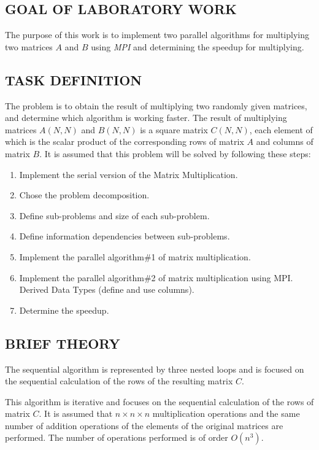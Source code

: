 \newpage
\subsection{GOAL OF LABORATORY WORK}\label{subsec:goal}

The purpose of this work is to implement two parallel algorithms for multiplying two matrices $A$ and $B$ using \textit{MPI} and determining the speedup for multiplying.

\subsection{TASK DEFINITION}\label{subsec:task_definition}

The problem is to obtain the result of multiplying two randomly given matrices, and determine which algorithm is working faster.
The result of multiplying matrices $A(N, N)$ and $B(N, N)$ is a square matrix $C(N, N)$, each element of which is the scalar product of the corresponding rows of matrix $A$ and columns of matrix $B$.
It is assumed that this problem will be solved by following these steps:
\begin{enumerate}
    \item Implement the serial version of the Matrix Multiplication.
    \item Chose the problem decomposition.
    \item Define sub-problems and size of each sub-problem.
    \item Define information dependencies between sub-problems.
    \item Implement the parallel algorithm\#1 of matrix multiplication.
    \item Implement the parallel algorithm\#2 of matrix multiplication using MPI. Derived Data Types (define and use columns).
    \item Determine the speedup.
\end{enumerate}

\subsection{BRIEF THEORY}\label{subsec:brief_theory}

The sequential algorithm is represented by three nested loops and is focused on the sequential calculation of the rows of the resulting matrix $C$.

This algorithm is iterative and focuses on the sequential calculation of the rows of matrix $C$. It is assumed that $n\times n\times n$ multiplication operations and the same number of addition operations of the elements of the original matrices are performed. The number of operations performed is of order $O(n^3)$.


